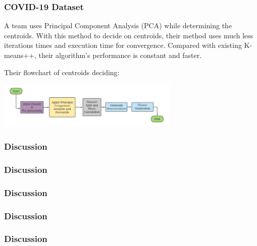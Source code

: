 \documentclass[9pt]{beamer}
\begin{document}
\begin{frame}
	\frametitle{COVID-19 Dataset}
A team uses Principal Component Analysis (PCA)  while determining the centroids. With this method to decide on centroids, their method uses much less iterations times and execution time for convergence. Compared with existing K-means++, their algorithm's performance is constant and faster. \par
Their flowchart of centroids deciding:
\centerline{\includegraphics[width=0.65\textwidth]{figures/COVID19.png}}

\end{frame}



\begin{frame}
	\frametitle{Discussion}

\end{frame}

\begin{frame}
	\frametitle{Discussion}

\end{frame}

\begin{frame}
	\frametitle{Discussion}

\end{frame}

\begin{frame}
	\frametitle{Discussion}

\end{frame}

\begin{frame}
	\frametitle{Discussion}

\end{frame}
\end{document}
